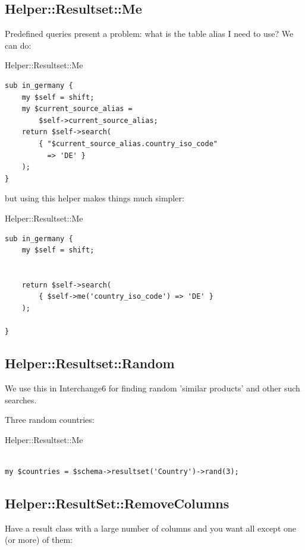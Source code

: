 \subsection{Helper::Resultset::Me}

Predefined queries present a problem: what is the table alias I need to use?
We can do:

\begin{frame}[fragile]{Helper::Resultset::Me}
\begin{lstlisting}
sub in_germany {
    my $self = shift;
    my $current_source_alias =
        $self->current_source_alias;
    return $self->search(
        { "$current_source_alias.country_iso_code"
          => 'DE' }
    );
}
\end{lstlisting}
\end{frame}

but using this helper makes things much simpler:

\begin{frame}[fragile]{Helper::Resultset::Me}
\begin{lstlisting}
sub in_germany {
    my $self = shift;


    return $self->search(
        { $self->me('country_iso_code') => 'DE' }
    );

}
\end{lstlisting}
\end{frame}

\subsection{Helper::Resultset::Random}

We use this in Interchange6 for finding random 'similar products' and other
such searches.

Three random countries:

\begin{frame}[fragile]{Helper::Resultset::Me}
\begin{lstlisting}

my $countries = $schema->resultset('Country')->rand(3);

\end{lstlisting}
\end{frame}

\subsection{Helper::ResultSet::RemoveColumns}
Have a result class with a large number of columns and you want all except
one (or more) of them:

